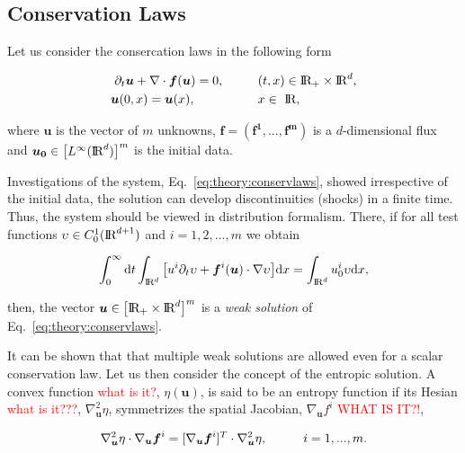 \subsection{Conservation Laws}

Let us consider the consercation laws in the following form

\begin{align}
\partial_t\boldsymbol{u} + \nabla\cdot\boldsymbol{f}(\boldsymbol{u}) = 0, \hspace{10mm} &(t,x)\in \text{I\!R}_{+}\times\text{I\!R}^d , \\
\boldsymbol{u}(0, x) = \boldsymbol{u}(x), \hspace{18mm} &x\in \text{ I\!R},
\label{eq:theory:conservlaws}
\end{align}

where $\boldsymbol{u}$ is the vector of $m$ unknowns, $\boldsymbol{f}=(\boldsymbol{\boldsymbol{f}^1,...,\boldsymbol{f}^m})$ is a $d$-dimensional flux and $\boldsymbol{u_0}\in\big[L^{\infty}(\text{I\!R}^d)\big]^m$ is the initial data. 

Investigations of the system, Eq.~\eqref{eq:theory:conservlaws}, showed irrespective of the initial data, the solution can develop discontinuities (shocks) in a finite time. 
%
Thus, the system should be viewed in distribution formalism. There, if for all test functions $\upsilon\in C_0 ^1 (\text{I\!R}^{d+1})$ and $i=1,2,...,m$  we obtain

\begin{equation}
\int_{0}^{\infty}\text{d}t\int_{\text{I\!R}^d}\big[u^i \partial_t\upsilon + \boldsymbol{f}^i(\boldsymbol{u})\cdot\nabla\upsilon\big]\text{d}x = \int_{\text{I\!R}^d} u_0 ^i \upsilon \text{d}x,
\end{equation}

then, the vector $\boldsymbol{u}\in\big[\text{I\!R}_{+}\times\text{I\!R}^d\big]^m$ is a \textit{weak solution} of Eq.~\eqref{eq:theory:conservlaws}.

It can be shown that that multiple weak solutions are allowed even for a scalar conservation law. Let us then consider the concept of the entropic solution. A convex function \textcolor{red}{what is it?}, $\eta(\boldsymbol{u})$, is said to be an entropy function if its Hesian \textcolor{red}{what is it???}, $\nabla_{\boldsymbol{u}}^2\eta$, symmetrizes the spatial Jacobian, $\nabla_{\boldsymbol{u}}f^i$ \textcolor{red}{WHAT IS IT?!},

\begin{equation}
\nabla_{\boldsymbol{u}}^2\eta\cdot\nabla_{\boldsymbol{u}}\boldsymbol{f}^i = [\nabla_{\boldsymbol{u}}\boldsymbol{f}^i]^{T}\cdot\nabla_{\boldsymbol{u}}^2\eta, \hspace{10mm} i = 1, ... , m.
\end{equation}

